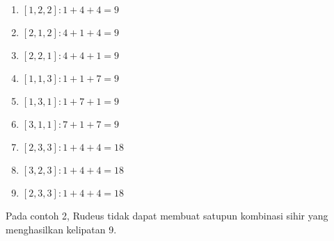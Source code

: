 \documentclass{article}
\begin{document}
\begin{enumerate}
\item $[1, 2, 2]: 1 + 4 + 4 = 9$
\item $[2, 1, 2]: 4 + 1 + 4 = 9$
\item $[2, 2, 1]: 4 + 4 + 1 = 9$
\item $[1, 1, 3]: 1 + 1 + 7 = 9$
\item $[1, 3, 1]: 1 + 7 + 1 = 9$
\item $[3, 1, 1]: 7 + 1 + 7 = 9$
\item $[2, 3, 3]: 1 + 4 + 4 = 18$
\item $[3, 2, 3]: 1 + 4 + 4 = 18$
\item $[2, 3, 3]: 1 + 4 + 4 = 18$
\end{enumerate}

Pada contoh 2, Rudeus tidak dapat membuat satupun kombinasi sihir yang menghasilkan kelipatan 9.
\end{document}
